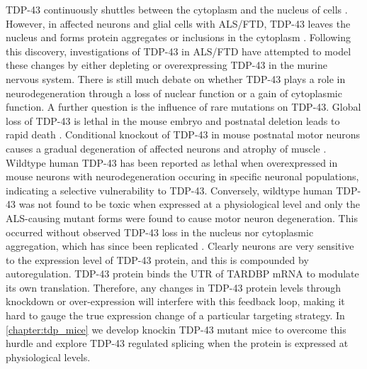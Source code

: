 TDP-43 continuously shuttles between the cytoplasm and the nucleus of cells \citep{Ayala2008}. However, in affected neurons and glial cells with ALS/FTD, TDP-43 leaves the nucleus and forms protein aggregates or inclusions in the cytoplasm \citep{Neumann2006-re}. Following this discovery, investigations of TDP-43 in ALS/FTD have attempted to model these changes by either depleting or overexpressing TDP-43 in the murine nervous system. There is still much debate on whether TDP-43 plays a role in neurodegeneration through a loss of nuclear function or a gain of cytoplasmic function.  A further question is the influence of rare mutations on TDP-43.
Global loss of TDP-43 is lethal in the mouse embryo \citep{Kraemer2010} and postnatal deletion leads to rapid death \citep{Chiang2010}. Conditional knockout of TDP-43 in mouse postnatal motor neurons causes a gradual degeneration of affected neurons and atrophy of muscle \citep{Iguchi2013}. Wildtype human TDP-43 has been reported as lethal when overexpressed in mouse neurons \citep{Shan2010,Wegorzewska2009} with neurodegeneration occuring in specific neuronal populations, indicating a selective vulnerability to TDP-43. Conversely, wildtype human TDP-43 was not found to be toxic when expressed at a physiological level \citep{Arnold2013} and only the ALS-causing mutant forms were found to cause motor neuron degeneration. This occurred without observed TDP-43 loss in the nucleus nor cytoplasmic aggregation, which has since been replicated \citep{Igaz2011}. Clearly neurons are very sensitive to the expression level of TDP-43 protein, and this is compounded by autoregulation. TDP-43 protein binds the UTR of TARDBP mRNA to modulate its own translation\citep{Ayala2011,Koyama2016}. Therefore, any changes in TDP-43 protein levels through knockdown or over-expression will interfere with this feedback loop, making it hard to gauge the true expression change of a particular targeting strategy. In \autoref{chapter:tdp_mice} we develop knockin TDP-43 mutant mice to overcome this hurdle and explore TDP-43 regulated splicing when the protein is expressed at physiological levels.



